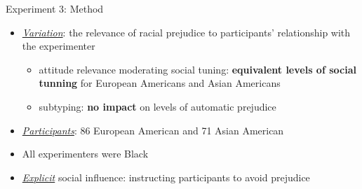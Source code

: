     \begin{frame}{Experiment 3: Method}
        \begin{itemize}
            \item \underline{\textit{Variation}}: the relevance of racial prejudice to participants' relationship with the experimenter
            \begin{itemize}
                \item attitude relevance moderating social tuning: \textcolor{lightlavender!55!white}{\textbf{equivalent levels of social tunning}} for European Americans and Asian Americans 
                \item subtyping: \textcolor{lightlavender!55!white}{\textbf{no impact}} on levels of automatic prejudice
            \end{itemize}
            \item \underline{\textit{Participants}}: 86 European American and 71 Asian American
            \item All experimenters were Black
            \item<+-> \underline{\textit{Explicit}} social influence: instructing participants to avoid prejudice
            
        \end{itemize}
    \end{frame}

